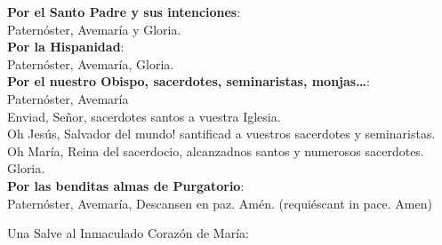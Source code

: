\documentclass[10pt,a4paper,oneside]{book}
\begin{document}
\textbf{Por el Santo Padre y sus intenciones}:\\
\hspace*{10mm}Paternóster, Avemaría y Gloria.\\
\textbf{Por la Hispanidad}:\\
\hspace*{10mm}Paternóster, Avemaría, Gloria.\\
\textbf{Por el nuestro Obispo, sacerdotes, seminaristas, monjas\ldots}:\\
\hspace*{10mm}Paternóster, Avemaría\\
\hspace*{10mm}Enviad, Señor, sacerdotes santos a vuestra Iglesia.\\
\hspace*{10mm}{!`}Oh Jesús, Salvador del mundo! santificad a vuestros sacerdotes y seminaristas.\\
\hspace*{10mm}Oh María, Reina del sacerdocio, alcanzadnos santos y numerosos sacerdotes.\\
\hspace*{10mm}Gloria.\\
\textbf{Por las benditas almas de Purgatorio}:\\
\hspace*{10mm}Paternóster, Avemaría, Descansen en paz. Amén. (requiéscant in pace. Amen)

\bigskip
{\label{hailMaryQueen}}Una Salve al Inmaculado Corazón de María:\\
\smallskip
\begin{minipage}[t]{0.475\textwidth}
      \\
      \ruegapornosotrossalve
\end{minipage}
\begin{minipage}[t]{0.475\textwidth}
      \\
\end{minipage}
\end{document}
